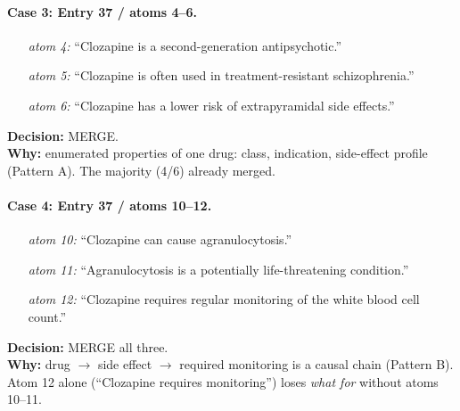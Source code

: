 \documentclass{article}
\begin{document}
\medskip
\paragraph{Case 3: Entry 37 / atoms 4--6.}
\begin{itemize}[leftmargin=1.8em,labelsep=0.5em,itemsep=2pt,topsep=3pt]
    \item[\textit{atom 4:}] ``Clozapine is a second-generation antipsychotic.''
    \item[\textit{atom 5:}] ``Clozapine is often used in treatment-resistant schizophrenia.''
    \item[\textit{atom 6:}] ``Clozapine has a lower risk of extrapyramidal side effects.''
\end{itemize}
\noindent\textbf{Decision:} MERGE. \\
\noindent\textbf{Why:} enumerated properties of one drug: class, indication, side-effect profile (Pattern A). The majority (4/6) already merged.

\medskip
\paragraph{Case 4: Entry 37 / atoms 10--12.}
\begin{itemize}[leftmargin=1.8em,labelsep=0.5em,itemsep=2pt,topsep=3pt]
    \item[\textit{atom 10:}] ``Clozapine can cause agranulocytosis.''
    \item[\textit{atom 11:}] ``Agranulocytosis is a potentially life-threatening condition.''
    \item[\textit{atom 12:}] ``Clozapine requires regular monitoring of the white blood cell count.''
\end{itemize}
\noindent\textbf{Decision:} MERGE all three. \\
\noindent\textbf{Why:} drug $\rightarrow$ side effect $\rightarrow$ required monitoring is a causal chain (Pattern B). Atom 12 alone (``Clozapine requires monitoring'') loses \textit{what for} without atoms 10--11.

\medskip
\end{document}
